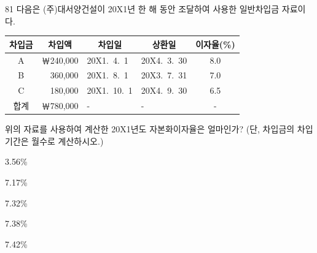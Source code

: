 \begin{question}{81}
다음은 (주)대서양건설이 20X1년 한 해 동안 조달하여 사용한 일반차입금 자료이다.

{\small\centering
\begin{tabular}{|c|r|l|l|c|}
\hline
차입금 & \multicolumn{1}{c|}{차입액} & \multicolumn{1}{c|}{차입일} & \multicolumn{1}{c|}{상환일} & 이자율(\%) \\
\hline
A & ￦240,000 & 20X1.\ 4.\ 1 & 20X4.\ 3.\ 30 & 8.0 \\
B & 360,000 & 20X1.\ 8.\ 1 & 20X3.\ 7.\ 31 & 7.0 \\
C & 180,000 & 20X1.\ 10.\ 1 & 20X4.\ 9.\ 30 & 6.5 \\
\hline
합계 & ￦780,000 & - & - & - \\
\hline
\end{tabular}\par}

위의 자료를 사용하여 계산한 20X1년도 자본화이자율은 얼마인가? (단, 차입금의 차입기간은 월수로 계산하시오.)
\begin{choices}
  \item 3.56\%
  \item 7.17\%
  \item 7.32\%
  \item 7.38\%
  \item 7.42\%
\end{choices}
\end{question}

